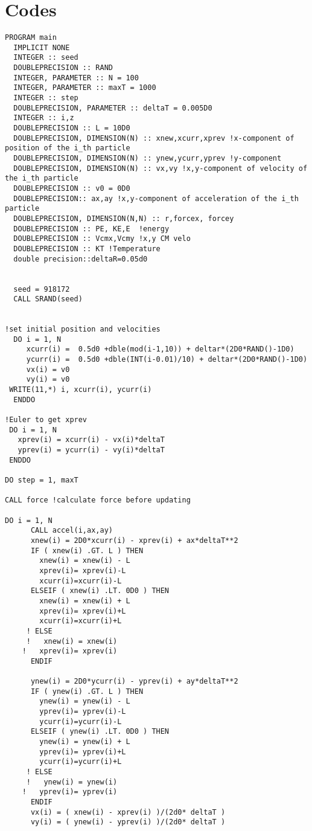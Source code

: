 \documentclass{article}
\begin{document}
\section{Codes}
\begin{verbatim}
PROGRAM main
  IMPLICIT NONE
  INTEGER :: seed
  DOUBLEPRECISION :: RAND
  INTEGER, PARAMETER :: N = 100
  INTEGER, PARAMETER :: maxT = 1000
  INTEGER :: step
  DOUBLEPRECISION, PARAMETER :: deltaT = 0.005D0
  INTEGER :: i,z
  DOUBLEPRECISION :: L = 10D0
  DOUBLEPRECISION, DIMENSION(N) :: xnew,xcurr,xprev !x-component of position of the i_th particle
  DOUBLEPRECISION, DIMENSION(N) :: ynew,ycurr,yprev !y-component
  DOUBLEPRECISION, DIMENSION(N) :: vx,vy !x,y-component of velocity of the i_th particle
  DOUBLEPRECISION :: v0 = 0D0
  DOUBLEPRECISION:: ax,ay !x,y-component of acceleration of the i_th particle
  DOUBLEPRECISION, DIMENSION(N,N) :: r,forcex, forcey
  DOUBLEPRECISION :: PE, KE,E  !energy
  DOUBLEPRECISION :: Vcmx,Vcmy !x,y CM velo
  DOUBLEPRECISION :: KT !Temperature
  double precision::deltaR=0.05d0


  seed = 918172
  CALL SRAND(seed)


!set initial position and velocities
  DO i = 1, N
     xcurr(i) =  0.5d0 +dble(mod(i-1,10)) + deltar*(2D0*RAND()-1D0)
     ycurr(i) =  0.5d0 +dble(INT(i-0.01)/10) + deltar*(2D0*RAND()-1D0)
	 vx(i) = v0
	 vy(i) = v0
 WRITE(11,*) i, xcurr(i), ycurr(i)
  ENDDO

!Euler to get xprev
 DO i = 1, N
   xprev(i) = xcurr(i) - vx(i)*deltaT
   yprev(i) = ycurr(i) - vy(i)*deltaT
 ENDDO
 
DO step = 1, maxT

CALL force !calculate force before updating

DO i = 1, N
	  CALL accel(i,ax,ay)
	  xnew(i) = 2D0*xcurr(i) - xprev(i) + ax*deltaT**2
      IF ( xnew(i) .GT. L ) THEN
	    xnew(i) = xnew(i) - L
        xprev(i)= xprev(i)-L
		xcurr(i)=xcurr(i)-L
	  ELSEIF ( xnew(i) .LT. 0D0 ) THEN
	    xnew(i) = xnew(i) + L
		xprev(i)= xprev(i)+L
		xcurr(i)=xcurr(i)+L
	 ! ELSE                              
	 !   xnew(i) = xnew(i)
	!	xprev(i)= xprev(i)
      ENDIF

	  ynew(i) = 2D0*ycurr(i) - yprev(i) + ay*deltaT**2
	  IF ( ynew(i) .GT. L ) THEN
	    ynew(i) = ynew(i) - L
        yprev(i)= yprev(i)-L
		ycurr(i)=ycurr(i)-L
	  ELSEIF ( ynew(i) .LT. 0D0 ) THEN
	    ynew(i) = ynew(i) + L
		yprev(i)= yprev(i)+L
		ycurr(i)=ycurr(i)+L
	 ! ELSE                              
	 !   ynew(i) = ynew(i)
	!	yprev(i)= yprev(i)
      ENDIF
	  vx(i) = ( xnew(i) - xprev(i) )/(2d0* deltaT )
	  vy(i) = ( ynew(i) - yprev(i) )/(2d0* deltaT )


\end{verbatim}
\end{document}
